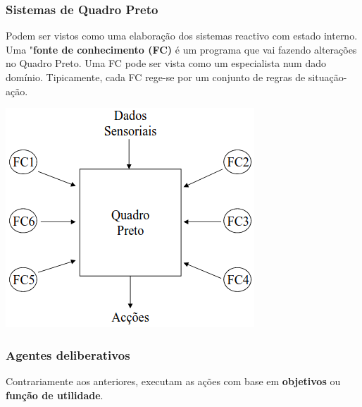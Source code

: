 \documentclass{article}
\begin{document}
\subsubsection*{Sistemas de Quadro Preto}

Podem ser vistos como uma
elaboração dos sistemas reactivo
com estado interno. Uma "\textbf{fonte de conhecimento (FC)} é um programa que vai
fazendo alterações no Quadro Preto. Uma FC pode ser vista como um especialista
num dado domínio. Tipicamente, cada FC rege-se por um conjunto de regras de situação-ação.

\begin{center}
  \includegraphics[scale=0.4]{13}
\end{center}

\pagebreak

\subsubsection{Agentes deliberativos}

Contrariamente aos anteriores, executam as ações com base em \textbf{objetivos} ou \textbf{função de
utilidade}.
\end{document}
